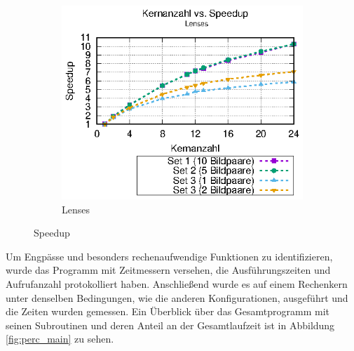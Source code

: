 \begin{center}
\begin{figure}
\begin{subfigure}[b]{0.49\textwidth}
			\includegraphics[width=\textwidth]{pdf/speedup_lenses}
			\caption[Lenses]{Lenses}
			\label{fig:speedup_lenses}
		\end{subfigure}
		\caption{Speedup}
		\label{fig:speedup}
	\end{figure}
\end{center}

Um Engpässe und besonders rechenaufwendige Funktionen zu identifizieren, wurde das Programm mit Zeitmessern versehen, die Ausführungszeiten und Aufrufanzahl protokolliert haben. Anschließend wurde es auf einem Rechenkern unter denselben Bedingungen, wie die anderen Konfigurationen, ausgeführt und die Zeiten wurden gemessen. Ein Überblick über das Gesamtprogramm mit seinen Subroutinen und deren Anteil an der Gesamtlaufzeit ist in Abbildung \ref{fig:perc_main} zu sehen.

